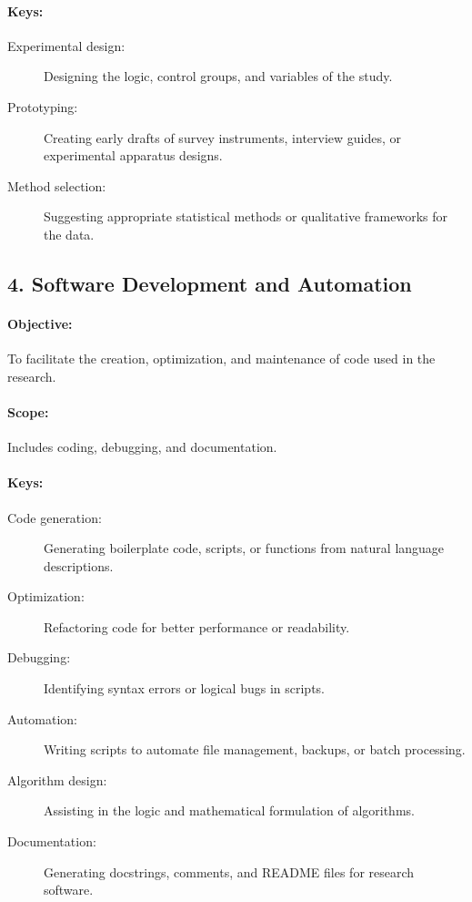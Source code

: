 \paragraph{Keys:}
\begin{description}
    \item[Experimental design:] Designing the logic, control groups, and variables of the study.
    \item[Prototyping:] Creating early drafts of survey instruments, interview guides, or experimental apparatus designs.
    \item[Method selection:] Suggesting appropriate statistical methods or qualitative frameworks for the data.
\end{description}

\subsection*{4. Software Development and Automation}
\paragraph{Objective:} To facilitate the creation, optimization, and maintenance of code used in the research.
\paragraph{Scope:} Includes coding, debugging, and documentation.
\paragraph{Keys:}
\begin{description}
    \item[Code generation:] Generating boilerplate code, scripts, or functions from natural language descriptions.
    \item[Optimization:] Refactoring code for better performance or readability.
    \item[Debugging:] Identifying syntax errors or logical bugs in scripts.
    \item[Automation:] Writing scripts to automate file management, backups, or batch processing.
    \item[Algorithm design:] Assisting in the logic and mathematical formulation of algorithms.
    \item[Documentation:] Generating docstrings, comments, and README files for research software.
\end{description}

